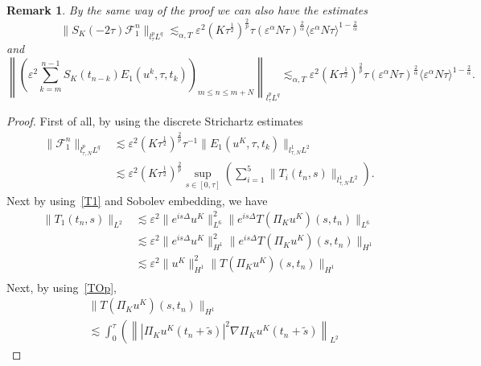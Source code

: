 \documentclass[10pt,a4paper]{article}
\newtheorem{remark}[theorem]{Remark}
\begin{document}
  \begin{remark}\label{remF1}
    By the same way of the proof we can also have the estimates 
    \[ \| S_K(-2\tau) \mathcal F_1^n \|_{l^p_\tau L^q} \lesssim_{\alpha,T}
    \varepsilon^2 (K\tau^\frac12)^\frac2p \tau 
    {(\varepsilon^\alpha N\tau)}^\frac2\alpha {\langle\varepsilon^\alpha N\tau\rangle}^{1-\frac2\alpha} \]
    and 
    \[ \left\| \left( \varepsilon^2 \sum_{k=m}^{n-1} S_K(t_{n-k}) E_1(u^k, \tau, t_k)
    \right)_{m \leq n \leq m+N} \right\|_{l^p_\tau L^q} \lesssim_{\alpha,T}
    \varepsilon^2 (K\tau^\frac12)^\frac2p \tau 
    {(\varepsilon^\alpha N\tau)}^\frac2\alpha {\langle\varepsilon^\alpha N\tau\rangle}^{1-\frac2\alpha}.%
    \]
  \end{remark}

  \begin{proof}
    First of all, by using the discrete Strichartz estimates
    \begin{equation}\label{F1lplq}
      \begin{aligned}
        \|\mathcal F_1^n\|_{l^p_{\tau,N}L^q} & \lesssim \varepsilon^2 (K\tau^\frac12)^\frac2p
        \tau^{-1} \|E_1(u^K, \tau, t_k)\|_{l^1_{\tau,N}L^2} \\ 
        &\lesssim \varepsilon^2 (K\tau^\frac12)^\frac2p \sup_{s \in [0,\tau]}
        \left(\sum_{i=1}^5 \|T_i(t_n,s)\|_{l^1_{\tau,N}L^2} \right).
      \end{aligned}
    \end{equation}
    Next by using~\eqref{T1} and Sobolev embedding, we have 
    \begin{equation}
      \begin{aligned}
        \|T_1(t_n,s)\|_{L^2} &\lesssim \varepsilon^2\|e^{is\Delta}u^K\|^2_{L^6} \|e^{is\Delta} T(\Pi_K u^K)(s,t_n)\|_{L^6} \\ 
        &\lesssim \varepsilon^2\|e^{is\Delta}u^K\|^2_{H^1} \|e^{is\Delta} T(\Pi_K u^K)(s,t_n)\|_{H^1} \\ 
        &\lesssim \varepsilon^2\|u^K\|^2_{H^1} \|T(\Pi_K u^K)(s,t_n)\|_{H^1} \\ 
      \end{aligned}
    \end{equation}
    Next, by using~\eqref{TOp},
    \begin{equation}\label{TH1}
      \begin{aligned}
        & \|T(\Pi_K u^K)(s,t_n)\|_{H^1} \\ & \lesssim 
        \int_0^\tau \left( 
        \left\| |\Pi_K u^K(t_n+\tilde{s})|^2 \nabla\Pi_K u^K(t_n+\tilde{s}) \right\|_{L^2}

\end{aligned}
\end{equation}
\end{proof}
\end{document}
